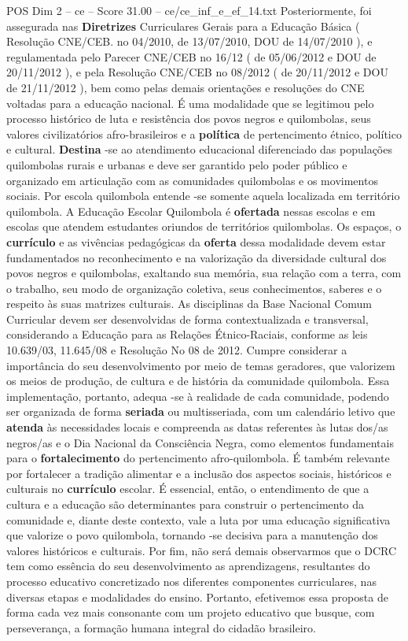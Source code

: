 \begin{textsample}{POS Dim 2 – ce – Score 31.00 – ce/ce\_inf\_e\_ef\_14.txt}
Posteriormente, foi assegurada nas \textbf{Diretrizes} Curriculares Gerais para a Educação Básica ( Resolução CNE/CEB. no 04/2010, de 13/07/2010, DOU de 14/07/2010 ), e regulamentada pelo Parecer CNE/CEB no 16/12 ( de 05/06/2012 e DOU de 20/11/2012 ), e pela Resolução CNE/CEB no 08/2012 ( de 20/11/2012 e DOU de 21/11/2012 ), bem como pelas demais orientações e resoluções do CNE voltadas para a educação nacional.
É uma modalidade que se legitimou pelo processo histórico de luta e resistência dos povos negros e quilombolas, seus valores civilizatórios afro-brasileiros e a \textbf{política} de pertencimento étnico, político e cultural. \textbf{Destina} -se ao atendimento educacional diferenciado das populações quilombolas rurais e urbanas e deve ser garantido pelo poder público e organizado em articulação com as comunidades quilombolas e os movimentos sociais.
Por escola quilombola entende -se somente aquela localizada em território quilombola.
A Educação Escolar Quilombola é \textbf{ofertada} nessas escolas e em escolas que atendem estudantes oriundos de territórios quilombolas.
Os espaços, o \textbf{currículo} e as vivências pedagógicas da \textbf{oferta} dessa modalidade devem estar fundamentados no reconhecimento e na valorização da diversidade cultural dos povos negros e quilombolas, exaltando sua memória, sua relação com a terra, com o trabalho, seu modo de organização coletiva, seus conhecimentos, saberes e o respeito às suas matrizes culturais.
As disciplinas da Base Nacional Comum Curricular devem ser desenvolvidas de forma contextualizada e transversal, considerando a Educação para as Relações Étnico-Raciais, conforme as leis 10.639/03, 11.645/08 e Resolução No 08 de 2012.
Cumpre considerar a importância do seu desenvolvimento por meio de temas geradores, que valorizem os meios de produção, de cultura e de história da comunidade quilombola.
Essa implementação, portanto, adequa -se à realidade de cada comunidade, podendo ser organizada de forma \textbf{seriada} ou multisseriada, com um calendário letivo que \textbf{atenda} às necessidades locais e compreenda as datas referentes às lutas dos/as negros/as e o Dia Nacional da Consciência Negra, como elementos fundamentais para o \textbf{fortalecimento} do pertencimento afro-quilombola.
É também relevante por fortalecer a tradição alimentar e a inclusão dos aspectos sociais, históricos e culturais no \textbf{currículo} escolar.
É essencial, então, o entendimento de que a cultura e a educação são determinantes para construir o pertencimento da comunidade e, diante deste contexto, vale a luta por uma educação significativa que valorize o povo quilombola, tornando -se decisiva para a manutenção dos valores históricos e culturais.
Por fim, não será demais observarmos que o DCRC tem como essência do seu desenvolvimento as aprendizagens, resultantes do processo educativo concretizado nos diferentes componentes curriculares, nas diversas etapas e modalidades do ensino.
Portanto, efetivemos essa proposta de forma cada vez mais consonante com um projeto educativo que busque, com perseverança, a formação humana integral do cidadão brasileiro.


\end{textsample}
